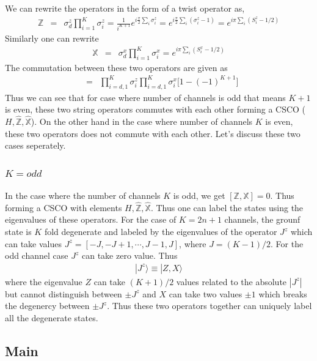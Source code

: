 \documentclass[reprint,prb,superscriptaddress]{revtex4-1}
\begin{document}
We can rewrite the operators in the form of a twist operator as,
\begin{eqnarray}
\mathbb{Z} &=& \sigma_d^z\displaystyle\prod_{i=1}^{K} \sigma_i^z = \frac{1}{i^{K+1}} e^{i\frac{\pi}{2} \sum_{i} \sigma^z_i}=e^{i\frac{\pi}{2} \sum_{i} (\sigma^z_i -1) } =e^{i\pi \sum_{i} (S^z_i -1/2) }
\end{eqnarray}
Similarly one can rewrite
\begin{eqnarray}
\mathbb{X} &=& \sigma_d^x\displaystyle\prod_{i=1}^{K} \sigma_i^x =e^{i\pi \sum_{i} (S^x_i -1/2) }
\end{eqnarray}
The commutation between these two operators are given as
\begin{eqnarray}
[\mathbb{Z},\mathbb{X}] &=& \prod_{i=d,1}^{K} \sigma^z_{i} \prod_{i=d,1}^{K} \sigma^x_{i} \bigg[1-(-1)^{K+1}\bigg]
\end{eqnarray}
Thus we can see that for case where number of channels is odd that means $K+1$ is even, these two string operators commutes with each other forming a CSCO ($H,\hat{\mathbb{Z}},\hat{\mathbb{X}}$). On the other hand in the case where number of channels $K$ is even, these two operators does not commute with each other. Let's discuss these two cases seperately.
\subsubsection{$K=odd$} 
In the case where the number of channels $K$ is odd, we get $[\mathbb{Z},\mathbb{X}]=0$. Thus forming a CSCO with elements $H,\hat{\mathbb{Z}},\hat{\mathbb{X}}$. Thus one can label the states using the eigenvalues of these operators. For the case of $K=2n+1$ channels, the grounf state is $K$ fold degenerate and labeled by the eigenvalues of the operator $J^z$ which can take values $J^z=[-J,-J+1,\cdots, J-1, J]$, where $J=(K-1)/2$. For the odd channel case $J^z$ can take zero value. Thus 
\begin{eqnarray}
|J^z\rangle \equiv |Z,X \rangle
\end{eqnarray}
where the eigenvalue $Z$ can take $(K+1)/2$ values related to the absolute $|J^z|$ but cannot distinguish between $\pm J^z$ and $X$ can take two values $\pm 1$ which breaks the degenercy between $\pm J^z$. Thus these two operators together can uniquely label all the degenerate states.

\subsection{Main}
\end{document}
